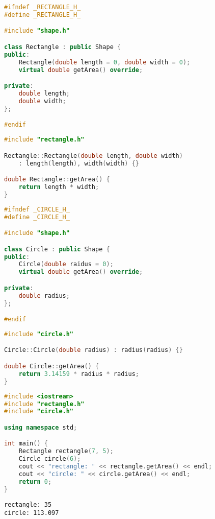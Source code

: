 \begin{lstlisting}[language=C++, title=rectangle.h]
#ifndef _RECTANGLE_H_
#define _RECTANGLE_H_

#include "shape.h"

class Rectangle : public Shape {
public:
	Rectangle(double length = 0, double width = 0);
	virtual double getArea() override;

private:
	double length;
	double width;
};

#endif
\end{lstlisting}

\begin{lstlisting}[language=C++, title=rectangle.cpp]
#include "rectangle.h"

Rectangle::Rectangle(double length, double width)
	: length(length), width(width) {}

double Rectangle::getArea() {
	return length * width;
}
\end{lstlisting}

\begin{lstlisting}[language=C++, title=circle.h]
#ifndef _CIRCLE_H_
#define _CIRCLE_H_

#include "shape.h"

class Circle : public Shape {
public:
	Circle(double raidus = 0);
	virtual double getArea() override;

private:
	double radius;
};

#endif
\end{lstlisting}

\begin{lstlisting}[language=C++, title=circle.cpp]
#include "circle.h"

Circle::Circle(double radius) : radius(radius) {}

double Circle::getArea() {
	return 3.14159 * radius * radius;
}
\end{lstlisting}

\begin{lstlisting}[language=C++, title=test\_shape.cpp]
#include <iostream>
#include "rectangle.h"
#include "circle.h"

using namespace std;

int main() {
	Rectangle rectangle(7, 5);
	Circle circle(6);
	cout << "rectangle: " << rectangle.getArea() << endl;
	cout << "circle: " << circle.getArea() << endl;
	return 0;
}
\end{lstlisting}

\begin{tcolorbox}
	\begin{verbatim}
rectangle: 35
circle: 113.097
	\end{verbatim}
\end{tcolorbox}

